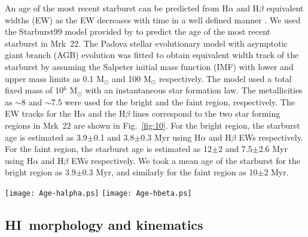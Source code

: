 \documentclass[useAMS,usenatbib]{mn2e}
\def\HI{H{\small{I}}~}
\begin{document}
An age of the most recent starburst can be predicted from H${\alpha}$ and H${\beta}$ equivalent widths (EW) as the EW decreases with time in a well defined manner \citep{1995ApJ...454L..19L,2000AJ....119.2146J}. We used the Starburst99 model provided by \citet{1999ApJS..123....3L} to predict the age of the most recent starburst in Mrk~22. The Padova stellar evolutionary model with asymptotic giant branch (AGB) evolution was fitted to obtain equivalent width track of the starburst by assuming the Salpeter initial mass function (IMF) with lower and upper mass limits as 0.1 M$_{\odot}$ and 100 M$_{\odot}$ respectively. The model used a total fixed mass of 10$^{6}$ M$_{\odot}$ with an instantaneous star formation law. The metallicities as $\sim$8 and $\sim$7.5 were used for the bright and the faint region, respectively. The EW tracks for the H$\alpha$ and the H$\beta$ lines correspond to the two star forming regions in Mrk~22 are shown in Fig.~\ref{fig:10}. For the bright region, the starburst age is estimated as 3.9$\pm$0.1 and 3.8$\pm$0.3 Myr using H${\alpha}$ and H${\beta}$ EWs respectively. For the faint region, the starburst age is estimated as 12$\pm$2 and 7.5$\pm$2.6 Myr using H${\alpha}$ and H${\beta}$ EWs respectively. We took a mean age of the starburst for the bright region as 3.9$\pm$0.3 Myr, and similarly for the faint region as 10$\pm$2 Myr. 

\begin{figure*}
\centering
\texttt{[image: Age-halpha.ps]}
\texttt{[image: Age-hbeta.ps]}
\caption{The computed tracks for H$\alpha$ (left) and H$\beta$ (right) EW versus age of the starburst in Mrk~22. The points (solid circle) with error bar represent the observed EW and the estimated age based on these tracks.}
\label{fig:10}
\end{figure*}

\subsection{\HI morphology and kinematics}
\end{document}
